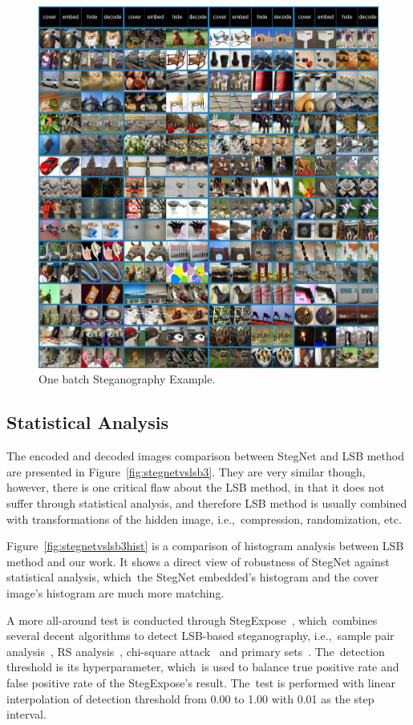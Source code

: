 \documentclass[futureinternet,article,accept,moreauthors,pdftex,10pt,a4paper]{Definitions/mdpi}
\begin{document}
\begin{figure}[H]
  \centering
  \includegraphics[width=\linewidth]{one_batch_example}
  \caption{One batch Steganography Example.}%
\label{fig:onebatch}
\end{figure}

\subsection{Statistical Analysis}%
\label{ssec:statanalysis}

The encoded and decoded images comparison between StegNet and LSB method are presented in Figure~\ref{fig:stegnetvslsb3}. They are very similar though, however, there is one critical flaw about the LSB method, in that it does not suffer through statistical analysis, and therefore LSB method is usually combined with transformations of the hidden image, i.e.,\ compression, randomization, etc.

Figure~\ref{fig:stegnetvslsb3hist} is a comparison of histogram analysis between LSB method and our work. It shows a direct view of robustness of StegNet against statistical analysis, which~the StegNet embedded's histogram and the cover image's histogram are much more matching.


A more all-around test is conducted through StegExpose~\cite{stegexpose}, which~combines several decent algorithms to detect LSB-based steganography, i.e.,\ sample pair analysis~\cite{samplepairanalysis}, RS analysis~\cite{fridrich2004reliable}, chi-square attack~\cite{westfeld1999attacks} and primary sets~\cite{dumitrescu2002steganalysis}. The~detection threshold is its hyperparameter, which~is used to balance true positive rate and false positive rate of the StegExpose's result. The~test is performed with linear interpolation of detection threshold from 0.00 to 1.00 with 0.01 as the step interval.
\end{document}
